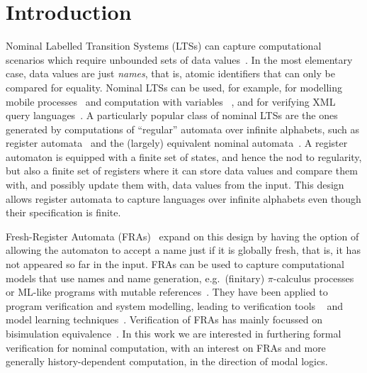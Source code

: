 \section{Introduction}

Nominal Labelled Transition Systems (LTSs) can capture computational scenarios which
require unbounded sets of data values~\cite{automatanominalsets}.
In the most elementary case, data values are just \emph{names}, that is, atomic identifiers that can only be compared for equality. Nominal LTSs can be used,
for example, for modelling mobile processes~\cite{HDA1}
and computation with variables ~\cite{KAMINSKI1994329,GrumbergKS10}, and for verifying XML query languages~\cite{SCHWENTICK2007289}.
A particularly popular class of nominal LTSs are the ones generated by computations of ``regular'' automata over infinite alphabets, such as register automata~\cite{KAMINSKI1994329} and the (largely) equivalent nominal automata~\cite{automatanominalsets}. A register automaton is 
equipped with a finite set of states, and hence the nod to regularity, but also a finite set of registers where it can store data values and compare them with, and possibly update them with, data values from the input. This design allows register automata to capture languages over infinite alphabets even though their specification is finite.



Fresh-Register Automata (FRAs)~\cite{fra} expand on this design by having the option of allowing the automaton to accept a name just if it is globally fresh, that is, it has not appeared so far in the input.
FRAs
 can be used to capture computational models that use names and
name generation, e.g.\ (finitary) $\pi$-calculus processes~\cite{fra,DBLP:journals/jsa/BandukaraT23} or ML-like programs with mutable references~\cite{nominalgamesemantics}.
 They have been applied to program verification and system modelling, leading to verification tools ~\cite{imj,nominalgamesemantics,runtimeverira} and model learning techniques~\cite{RCDL,LearningRAFreshval}.
Verification of FRAs has mainly focussed on bisimulation equivalence~\cite{fra,BFRA,deqtheory}. In this work we are interested in furthering formal
verification for nominal computation, with an interest on FRAs and more generally history-dependent computation, in the direction of modal logics.



